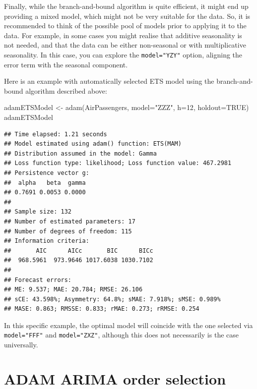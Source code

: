 \documentclass[
]{book}
\newenvironment{Shaded}{\begin{snugshade}}{\end{snugshade}}
\newcommand{\AttributeTok}[1]{\textcolor[rgb]{0.77,0.63,0.00}{#1}}
\newcommand{\ConstantTok}[1]{\textcolor[rgb]{0.00,0.00,0.00}{#1}}
\newcommand{\DecValTok}[1]{\textcolor[rgb]{0.00,0.00,0.81}{#1}}
\newcommand{\FunctionTok}[1]{\textcolor[rgb]{0.00,0.00,0.00}{#1}}
\newcommand{\NormalTok}[1]{#1}
\newcommand{\OtherTok}[1]{\textcolor[rgb]{0.56,0.35,0.01}{#1}}
\newcommand{\StringTok}[1]{\textcolor[rgb]{0.31,0.60,0.02}{#1}}
\theoremstyle{definition}
\theoremstyle{definition}
\theoremstyle{definition}
\theoremstyle{definition}
\theoremstyle{remark}
\begin{document}
Finally, while the branch-and-bound algorithm is quite efficient, it might end up providing a mixed model, which might not be very suitable for the data. So, it is recommended to think of the possible pool of models prior to applying it to the data. For example, in some cases you might realise that additive seasonality is not needed, and that the data can be either non-seasonal or with multiplicative seasonality. In this case, you can explore the \texttt{model="YZY"} option, aligning the error term with the seasonal component.

Here is an example with automatically selected ETS model using the branch-and-bound algorithm described above:

\begin{Shaded}
\begin{Highlighting}[]
\NormalTok{adamETSModel }\OtherTok{\textless{}{-}} \FunctionTok{adam}\NormalTok{(AirPassengers, }\AttributeTok{model=}\StringTok{"ZZZ"}\NormalTok{, }\AttributeTok{h=}\DecValTok{12}\NormalTok{, }\AttributeTok{holdout=}\ConstantTok{TRUE}\NormalTok{)}
\NormalTok{adamETSModel}
\end{Highlighting}
\end{Shaded}

\begin{verbatim}
## Time elapsed: 1.21 seconds
## Model estimated using adam() function: ETS(MAM)
## Distribution assumed in the model: Gamma
## Loss function type: likelihood; Loss function value: 467.2981
## Persistence vector g:
##  alpha   beta  gamma 
## 0.7691 0.0053 0.0000 
## 
## Sample size: 132
## Number of estimated parameters: 17
## Number of degrees of freedom: 115
## Information criteria:
##       AIC      AICc       BIC      BICc 
##  968.5961  973.9646 1017.6038 1030.7102 
## 
## Forecast errors:
## ME: 9.537; MAE: 20.784; RMSE: 26.106
## sCE: 43.598%; Asymmetry: 64.8%; sMAE: 7.918%; sMSE: 0.989%
## MASE: 0.863; RMSSE: 0.833; rMAE: 0.273; rRMSE: 0.254
\end{verbatim}

In this specific example, the optimal model will coincide with the one selected via \texttt{model="FFF"} and \texttt{model="ZXZ"}, although this does not necessarily is the case universally.

\hypertarget{ARIMASelection}{%
\section{ADAM ARIMA order selection}\label{ARIMASelection}}
\end{document}
